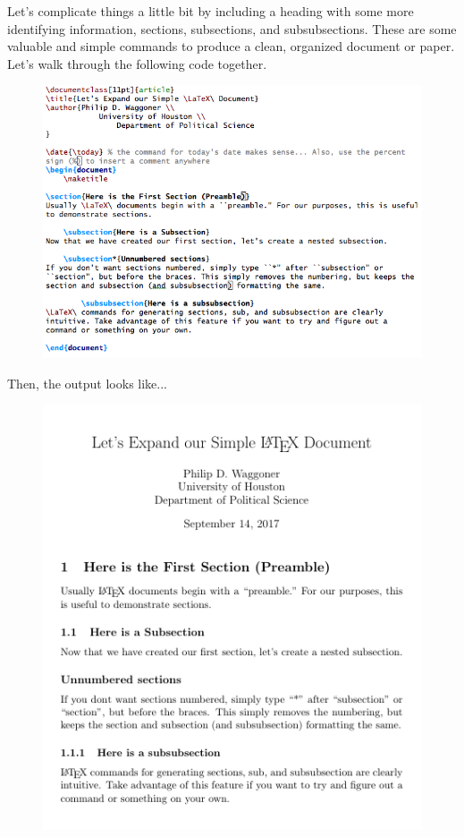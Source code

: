 \documentclass[11pt]{article}
\begin{document}
\newpage 

	Let's complicate things a little bit by including a heading with some more identifying information, sections, subsections, and subsubsections. These are some valuable and simple commands to produce a clean, organized document or paper. Let's walk through the following code together. \\

\begin{figure}[!h]
	\includegraphics[scale=.6]{CODE2} \\ %
\end{figure}	

\newpage

Then, the output looks like... \\

\begin{figure}[!h]
	\includegraphics[scale=.7]{OUT2} \\ %
	\centering
\end{figure}
\end{document}
